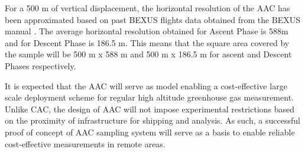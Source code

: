 For a 500 m of vertical displacement, the horizontal resolution of the AAC has been approximated based on past BEXUS flights data obtained from the BEXUS manual \cite{BexusManual}. The average horizontal resolution obtained for Ascent Phase is 588m and for Descent Phase is 186.5 m. This means that the square area covered by the sample will be 500 m x 588 m and 500 m x 186.5 m for ascent and Descent Phases respectively.

It is expected that the AAC will serve as model enabling a cost-effective large scale deployment scheme for regular high altitude greenhouse gas measurement. Unlike CAC, the design of AAC will not impose experimental restrictions based on the proximity of infrastructure for shipping and analysis. As such, a successful proof of concept of AAC sampling system will serve as a basis to enable reliable cost-effective measurements in remote areas.


